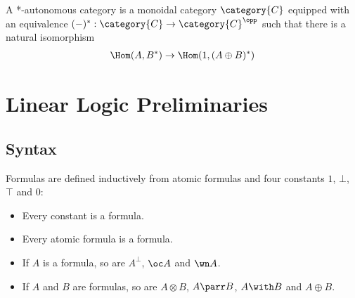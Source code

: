 \documentclass[DIN, pagenumber=false, fontsize=11pt, parskip=half, colorinlistoftodos, svgnames]{scrartcl}
\newcommand{\urgentnote}[2][]{\todo[color=red, #1]{#2}}
\begin{document}
	
	\begin{definition}
		\label{def: autoCatBarrC}
		A *-autonomous category is a monoidal category $\category{C} $ equipped with an equivalence $(-)^* : \category{C} \rightarrow \category{C}^\opp $ such that there is a natural isomorphism 
		\begin{align*}
			\Hom(A, B^*) \rightarrow \Hom(1, (A \oplus B)^*)
		\end{align*}
	\end{definition}
	\fi 



	
	\section{Linear Logic Preliminaries}
	
	
	\subsection{Syntax}
	
	
	\begin{definition}[Formula]
		Formulas are defined inductively from atomic formulas and four constants $1$, $\bot$, $\top$ and $0$:
		\begin{itemize}
			\item Every constant is a formula.
			\item Every atomic formula is a formula.
			\item If $A$ is a formula, so are $A^\bot$,  $\oc A$ and $\wn A$.
			\item If $A$ and $B$ are formulas, so are $A \otimes B$, $A \parr B$, $A \with B$ and $A \oplus B$.
		\end{itemize}
	\end{definition}
	
\end{document}

